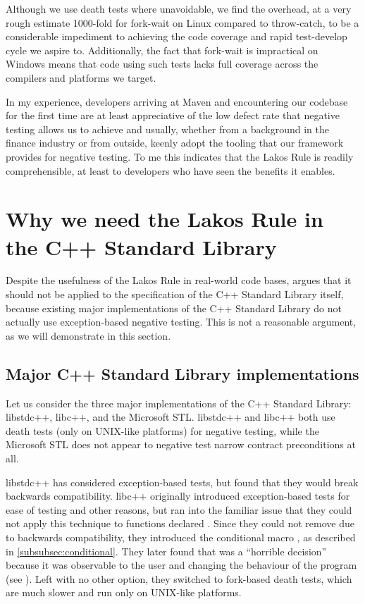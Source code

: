 Although we use death tests where unavoidable, we find the overhead, at a very rough estimate 1000-fold for fork-wait on Linux compared to throw-catch, to be a considerable impediment to achieving the code coverage and rapid test-develop cycle we aspire to. Additionally, the fact that fork-wait is impractical on Windows means that code using such tests lacks full coverage across the compilers and platforms we target.

In my experience, developers arriving at Maven and encountering our codebase for the first time are at least appreciative of the low defect rate that negative testing allows us to achieve and usually, whether from a background in the finance industry or from outside, keenly adopt the tooling that our framework provides for negative testing. To me this indicates that the Lakos Rule is readily comprehensible, at least to developers who have seen the benefits it enables.

\section{Why we need the Lakos Rule in the C++ Standard Library}
\label{sec:stdlib}

Despite the usefulness of the Lakos Rule in real-world code bases, \cite{P1656R2} argues that it should not be applied to the specification of the C++ Standard Library itself, because existing major implementations of the C++ Standard Library do not actually use exception-based negative testing. This is not a reasonable argument, as we will demonstrate in this section.

\subsection{Major C++ Standard Library implementations}
\label{subsec:major}

Let us consider the three major implementations of the C++ Standard Library: libstdc++, libc++, and the Microsoft STL. libstdc++ and libc++ both use death tests (only on UNIX-like platforms) for negative testing, while the Microsoft STL does not appear to negative test narrow contract preconditions at all.

libstdc++ has considered exception-based tests, but found that they would break backwards compatibility. libc++ originally introduced exception-based tests for ease of testing and other reasons, but ran into the familiar issue that they could not apply this technique to functions declared . Since they could not remove  due to backwards compatibility, they introduced the conditional  macro  , as described in \ref{subsubsec:conditional}. They later found that  was a ``horrible decision'' because  it was observable to the user and changing the behaviour of the program (see \cite{LLVMReviewD59166}). Left with no other option, they switched to fork-based death tests, which are much slower and run only on UNIX-like platforms.

